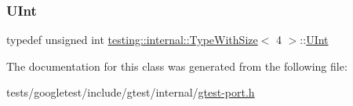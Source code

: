 \subsubsection{\texorpdfstring{U\+Int}{UInt}}
{\footnotesize\ttfamily typedef unsigned int \hyperlink{classtesting_1_1internal_1_1TypeWithSize}{testing\+::internal\+::\+Type\+With\+Size}$<$ 4 $>$\+::\hyperlink{classtesting_1_1internal_1_1TypeWithSize_3_014_01_4_a7d559570f830bf35d095eeb94d98de58}{U\+Int}}



The documentation for this class was generated from the following file\+:\begin{DoxyCompactItemize}
\item 
tests/googletest/include/gtest/internal/\hyperlink{gtest-port_8h}{gtest-\/port.\+h}\end{DoxyCompactItemize}
